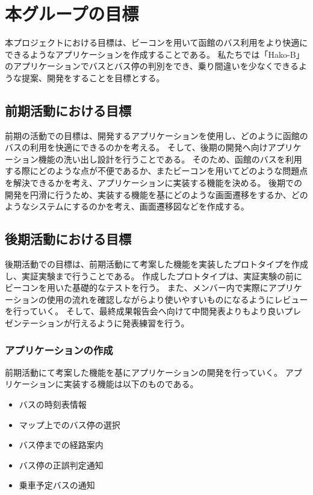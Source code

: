\documentclass[openany,11pt,papersize]{jsbook}
\begin{document}
\section{本グループの目標}
本プロジェクトにおける目標は、ビーコンを用いて函館のバス利用をより快適にできるようなアプリケーションを作成することである。
私たちでは「Hako-B」のアプリケーションでバスとバス停の判別をでき、乗り間違いを少なくできるような提案、開発をすることを目標とする。


\subsection{前期活動における目標}
前期の活動での目標は、開発するアプリケーションを使用し、どのように函館のバスの利用を快適にできるのかを考える。
そして、後期の開発へ向けアプリケーション機能の洗い出し設計を行うことである。
そのため、函館のバスを利用する際にどのような点が不便であるか、またビーコンを用いてどのような問題点を解決できるかを考え、アプリケーションに実装する機能を決める。
後期での開発を円滑に行うため、実装する機能を基にどのような画面遷移をするか、どのようなシステムにするのかを考え、画面遷移図などを作成する。


\subsection{後期活動における目標}
後期活動での目標は、前期活動にて考案した機能を実装したプロトタイプを作成し、実証実験まで行うことである。
作成したプロトタイプは、実証実験の前にビーコンを用いた基礎的なテストを行う。
また、メンバー内で実際にアプリケーションの使用の流れを確認しながらより使いやすいものになるようにレビューを行っていく。
そして、最終成果報告会へ向けて中間発表よりもより良いプレゼンテーションが行えるように発表練習を行う。


\subsubsection{アプリケーションの作成}
前期活動にて考案した機能を基にアプリケーションの開発を行っていく。
アプリケーションに実装する機能は以下のものである。
\begin{itemize}

\item バスの時刻表情報
\item マップ上でのバス停の選択
\item バス停までの経路案内
\item バス停の正誤判定通知
\item 乗車予定バスの通知

\end{itemize}
\end{document}
